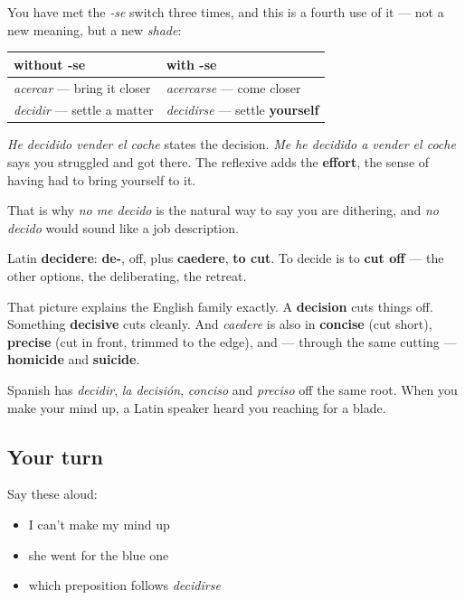 \begin{grammarlens}[title={Grammar Lens: what the -se adds here}]
You have met the \emph{-se} switch three times, and this is a fourth use of it — not a new meaning, but a new \emph{shade}:

\noindent
\begin{tabularx}{\linewidth}{@{}>{\raggedright\arraybackslash}X>{\raggedright\arraybackslash}X@{}}
\toprule
\textbf{without -se} & \textbf{with -se} \\
\midrule
\emph{acercar} — bring it closer & \emph{acercarse} — come closer \\
\emph{decidir} — settle a matter & \emph{decidirse} — settle \textbf{yourself} \\
\bottomrule
\end{tabularx}

\emph{He decidido vender el coche} states the decision. \emph{Me he decidido a vender el coche} says you struggled and got there. The reflexive adds the \textbf{effort}, the sense of having had to bring yourself to it.

That is why \emph{no me decido} is the natural way to say you are dithering, and \emph{no decido} would sound like a job description.
\end{grammarlens}

\begin{cousinweb}
Latin \textbf{decidere}: \textbf{de-}, off, plus \textbf{caedere}, \textbf{to cut}. To decide is to \textbf{cut off} — the other options, the deliberating, the retreat.

That picture explains the English family exactly. A \textbf{decision} cuts things off. Something \textbf{decisive} cuts cleanly. And \emph{caedere} is also in \textbf{concise} (cut short), \textbf{precise} (cut in front, trimmed to the edge), and — through the same cutting — \textbf{homicide} and \textbf{suicide}.

Spanish has \emph{decidir}, \emph{la decisión}, \emph{conciso} and \emph{preciso} off the same root. When you make your mind up, a Latin speaker heard you reaching for a blade.
\end{cousinweb}

\subsection*{Your turn}
Say these aloud:

\begin{itemize}
\raggedright
  \item I can't make my mind up
  \item she went for the blue one
  \item which preposition follows \emph{decidirse}
\end{itemize}

